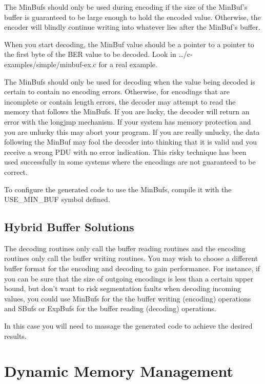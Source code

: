 The {\C MinBuf}s should only be used during encoding if the size of
the {\C MinBuf}'s buffer is guaranteed to be large enough to hold
the encoded value. Otherwise, the encoder will blindly continue
writing into whatever lies after the {\C MinBuf}'s buffer.

When you start decoding, the {\C MinBuf} value should be a pointer
to a pointer to the first byte of the BER value to be decoded.  Look
in {\ufn \dots/c-examples/simple/minbuf-ex.c} for a real example.

The {\C MinBuf}s should only be used for decoding when the value
being decoded is certain to contain no encoding errors. Otherwise, for
encodings that are incomplete or contain length errors, the decoder may
attempt to read the memory that follows the {\C MinBuf}s. If you are
lucky, the decoder will return an error with the {\C longjmp}
mechanism. If your system has memory protection and you are unlucky
this may abort your program.  If you are really unlucky, the data
following the {\C MinBuf} may fool the decoder into thinking that it
is valid and you receive a wrong PDU with no error indication.  This
risky technique has been used successfully in some systems where the
encodings are not guaranteed to be correct.

To configure the generated code to use the {\C MinBuf}s, compile it
with the {\C USE\_MIN\_BUF} symbol defined.

\subsection{Hybrid Buffer Solutions}

The decoding routines only call the buffer reading routines and the
encoding routines only call the buffer writing routines.  You may wish
to choose a different buffer format for the encoding and decoding to
gain performance.  For instance, if you can be sure that the size of
outgoing encodings is less than a certain upper bound, but don't want
to risk segmentation faults when decoding incoming values, you could
use {\C MinBuf}s for the the buffer writing (encoding) operations
and {\C SBuf}s or {\C ExpBuf}s for the buffer reading (decoding)
operations.

In this case you will need to massage the generated code to achieve
the desired results.

\section{\label{lib-mem-C-section}Dynamic Memory Management}

